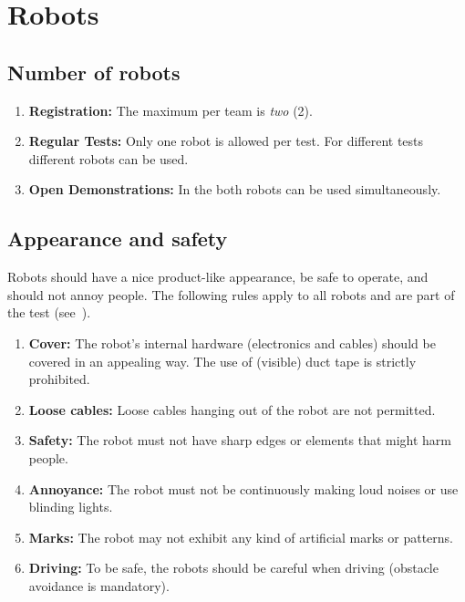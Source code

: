 \section{Robots}
\label{rule:robots}

\subsection{Number of robots}
\label{rule:robots_number}

\begin{enumerate}
	\item \textbf{Registration:} The maximum  per team is \emph{two} (2).
	\item \textbf{Regular Tests:} Only one robot is allowed per test. For different tests different robots can be used.
	\item \textbf{Open Demonstrations:} In the  both robots can be used simultaneously.
\end{enumerate}

\subsection{Appearance and safety}
\label{rule:robot_appearance}

Robots should have a nice product-like appearance, be safe to operate, and should not annoy people. The following rules apply to all robots and are part of the  test (see~).
\begin{enumerate}
	\item \textbf{Cover:} The robot's internal hardware (electronics and cables) should be covered in an appealing way. The use of (visible) duct tape is strictly prohibited.
	\item \textbf{Loose cables:} Loose cables hanging out of the robot are not permitted.
	\item \textbf{Safety:} The robot must not have sharp edges or elements that might harm people.
	\item \textbf{Annoyance:} The robot must not be continuously making loud noises or use blinding lights.
	\item \textbf{Marks:} The robot may not exhibit any kind of artificial marks or patterns.
	\item \textbf{Driving:} To be safe, the robots should be careful when driving (obstacle avoidance is mandatory).
\end{enumerate}







